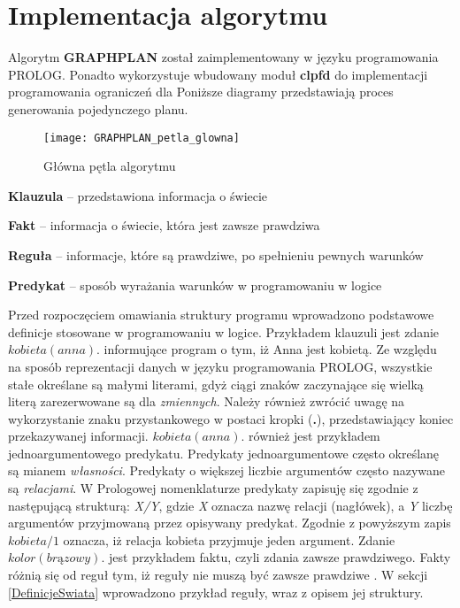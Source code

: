 \section{Implementacja algorytmu}
    Algorytm \textbf{GRAPHPLAN} został zaimplementowany w języku programowania PROLOG. Ponadto wykorzystuje wbudowany moduł 
    \textbf{clpfd} do implementacji programowania ograniczeń dla  Poniższe diagramy przedstawiają proces  
    generowania pojedynczego planu.
    \begin{figure}[H]
        \label{PetlaGlowna}
        \texttt{[image: GRAPHPLAN\_petla\_glowna]}
        \centering
        \caption{Główna pętla algorytmu}
    \end{figure}

    \begin{definition}
        \label{Predykat}
        \textbf{Klauzula} -- przedstawiona informacja o świecie
    \end{definition}

    \begin{definition}
        \label{Fakt}
        \textbf{Fakt} -- informacja o świecie, która jest zawsze prawdziwa
    \end{definition}

    \begin{definition}
        \label{Regula}
        \textbf{Reguła} -- informacje, które są prawdziwe, po spełnieniu pewnych warunków
    \end{definition}

    \begin{definition}
        \label{Predykat}
        \textbf{Predykat} -- sposób wyrażania warunków w programowaniu w logice
    \end{definition}


    Przed rozpoczęciem omawiania struktury programu wprowadzono podstawowe definicje stosowane w programowaniu w logice. Przykładem klauzuli jest 
    zdanie $kobieta(anna).$ informujące program o tym, iż Anna jest kobietą. Ze względu na sposób reprezentacji danych w języku programowania PROLOG, 
    wszystkie stałe określane są małymi literami, gdyż ciągi znaków zaczynające się wielką literą zarezerwowane są dla \textit{zmiennych}. Należy 
    również zwrócić uwagę na wykorzystanie znaku przystankowego w postaci kropki (\textbf{.}), przedstawiający koniec przekazywanej informacji. 
    $kobieta(anna).$ również jest przykładem jednoargumentowego predykatu. Predykaty jednoargumentowe często określanę są mianem \textit{własności}.
    Predykaty o większej liczbie argumentów często nazywane są \textit{relacjami}. W Prologowej nomenklaturze predykaty zapisuję się zgodnie 
    z następującą strukturą: \textit{X/Y}, gdzie \textit{X} oznacza nazwę relacji (nagłówek), a \textit{Y} liczbę argumentów przyjmowaną przez 
    opisywany predykat. Zgodnie z powyższym zapis $kobieta/1$ oznacza, iż relacja kobieta przyjmuje jeden argument.
    Zdanie $kolor(brązowy).$ jest przykładem faktu, czyli zdania zawsze prawdziwego. Fakty różnią się od reguł tym, iż reguły nie muszą być zawsze prawdziwe \cite{PROLOG}.
    W sekcji \ref{DefinicjeSwiata} wprowadzono przykład reguły, wraz z opisem jej struktury.

